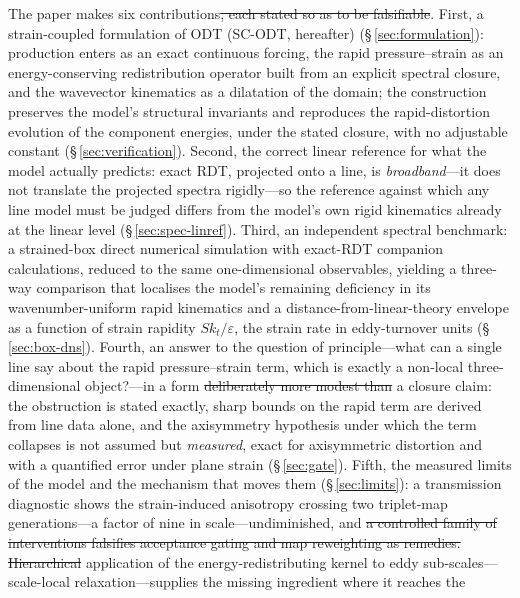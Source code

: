 \documentclass[lineno]{JFM-FLM_Au}
\providecommand{\DIFadd}[1]{{\protect\color{blue}\uwave{#1}}} %
\providecommand{\DIFdel}[1]{{\protect\color{red}\sout{#1}}} %
\providecommand{\DIFaddbegin}{} %
\providecommand{\DIFaddend}{} %
\providecommand{\DIFdelbegin}{} %
\providecommand{\DIFdelend}{} %
\begin{document}
The paper makes six contributions\DIFdelbegin \DIFdel{, each stated so as to be falsifiable}\DIFdelend .
First, a strain-coupled formulation of ODT (SC-ODT, hereafter)
(\S\,\ref{sec:formulation}):
production enters as an exact continuous forcing, the rapid
pressure--strain as an energy-conserving redistribution operator built
from an explicit spectral closure, and the wavevector kinematics as a
dilatation of the domain; the construction preserves the model's
structural invariants and reproduces the rapid-distortion evolution of
the component energies, under the stated closure, with no adjustable
constant (\S\,\ref{sec:verification}). Second, the correct linear
reference for what the model actually predicts: exact RDT, projected
onto a line, is \emph{broadband}---it does not translate the projected
spectra rigidly---so the reference against which any line model must be
judged differs from the model's own rigid kinematics already at the
linear level (\S\,\ref{sec:spec-linref}). Third, an independent spectral
benchmark: a strained-box direct numerical simulation with exact-RDT
companion calculations, reduced to the same one-dimensional observables,
yielding a three-way comparison that localises the model's remaining
deficiency in its wavenumber-uniform rapid kinematics and a
distance-from-linear-theory envelope as a function of strain rapidity
$Sk_t/\varepsilon$, the strain rate in eddy-turnover units
(\S\,\ref{sec:box-dns}). Fourth, an answer to the question of
principle---what can a single line say about the rapid pressure--strain
term, which is exactly a non-local three-dimensional object?---in a form \DIFdelbegin \DIFdel{deliberately more modest than }\DIFdelend \DIFaddbegin \DIFadd{short of }\DIFaddend a closure claim: the obstruction is stated
exactly, sharp bounds on the rapid term are derived from line data
alone, and the axisymmetry hypothesis under which the term collapses is
not assumed but \emph{measured}, exact for axisymmetric distortion and
with a quantified error under plane strain (\S\,\ref{sec:gate}). Fifth,
the measured limits of the model and the mechanism that moves them
(\S\,\ref{sec:limits}): a transmission diagnostic shows the
strain-induced anisotropy crossing two triplet-map generations---a
factor of nine in scale---undiminished, and \DIFdelbegin \DIFdel{a controlled family of interventions falsifies acceptance gating
and map reweighting as remedies. Hierarchical }\DIFdelend \DIFaddbegin \DIFadd{hierarchical }\DIFaddend application of the
energy-redistributing kernel to eddy sub-scales---scale-local
relaxation---supplies the missing ingredient where it reaches the
\end{document}
